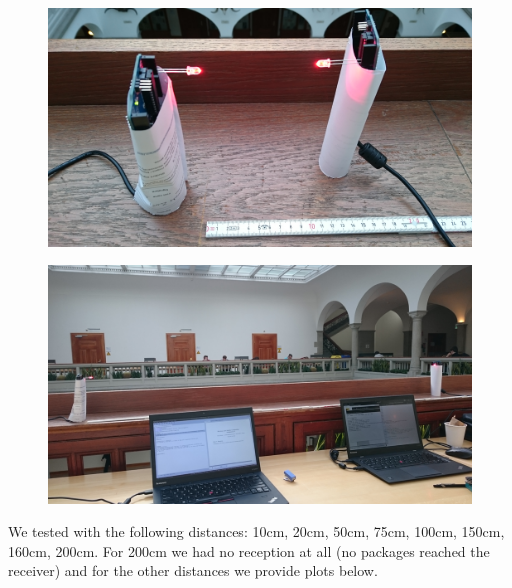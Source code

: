 \begin{figure}[htp]
\centering
\includegraphics[scale=0.1]{../img/setup_1.JPG}
\caption{}
\label{}
\end{figure}
\begin{figure}[htp]
\centering
\includegraphics[scale=0.1]{../img/setup_2.JPG}
\caption{}
\label{}
\end{figure}
We tested with the following distances: 10cm, 20cm, 50cm, 75cm, 100cm, 150cm, 160cm, 200cm.
For 200cm we had no reception at all (no packages reached the receiver) and for the other distances we provide plots below.
